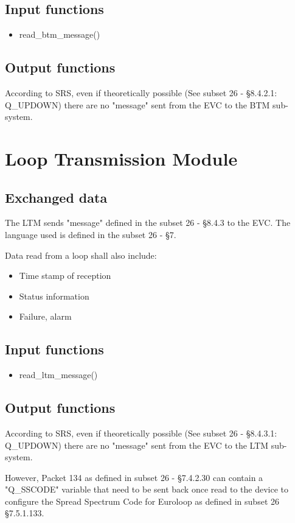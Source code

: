 \documentclass{template/openetcs_article}
\begin{document}
	\subsection{Input functions}
		\begin{itemize}
			\item read\_btm\_message()
		\end{itemize}
	\subsection{Output functions}
		According to SRS, even if theoretically possible (See subset 26 - §8.4.2.1: Q\_UPDOWN) there are no "message" sent from the EVC to the BTM sub-system.
		
\section{Loop Transmission Module}
	\subsection{Exchanged data}
			The LTM sends "message" defined in the subset 26 - §8.4.3 to the EVC. The language used is defined in the subset 26 - §7.
			
			Data read from a loop shall also include:
			\begin{itemize}
				\item Time stamp of reception
				\item Status information
				\item Failure, alarm
			\end{itemize}
		\subsection{Input functions}
			\begin{itemize}
				\item read\_ltm\_message()
			\end{itemize}
		\subsection{Output functions}
			According to SRS, even if theoretically possible (See subset 26 - §8.4.3.1: Q\_UPDOWN) there are no "message" sent from the EVC to the LTM sub-system.
			
			However, Packet 134 as defined in subset 26 - §7.4.2.30 can contain a "Q\_SSCODE" variable that need to be sent back once read to the device to configure the Spread Spectrum Code for Euroloop as defined in subset 26 §7.5.1.133.
			
\end{document}
